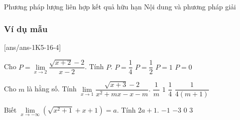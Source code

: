 \begin{dang}{Phương pháp lượng liên hợp kết quả hữu hạn}
	Nội dung và phương pháp giải
\end{dang}
\subsubsection{Ví dụ mẫu}
[ans/ans-1K5-16-4]
\setcounter{vd}{0}
	\begin{vd}%
	Cho $P = \lim \limits_{x \to 2} \dfrac{\sqrt{x+2}-2}{x-2}$. Tính $P$.
	\choice
	{\True $P = \dfrac{1}{4}$}
	{$P = \dfrac{1}{2}$}
	{$P = 1$}
	{$P = 0$}
\end{vd}
\begin{vd}%
	Cho $m$ là hằng số. Tính $\lim\limits_{x\to 1}\dfrac{\sqrt{x+3}-2}{x^2+mx-x-m}$.
	\choice
	{$\dfrac{1}{m}$}
	{$1$}
	{$\dfrac{1}{4}$}
	{\True $\dfrac{1}{4(m+1)}$}
\end{vd}
\begin{vd}%
	Biết $\lim\limits_{x\to -\infty}\left(\sqrt{x^2+1}+x+1\right)=a$. Tính $2a+1.$
	\choice
	{$-1$}
	{$-3$}
	{$0$}
	{\True $3$}
\end{vd}


